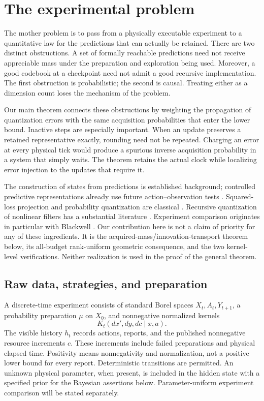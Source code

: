 \section{The experimental problem}\label{sec:experiment}
The mother problem is to pass from a physically executable experiment to a quantitative law for the predictions that can actually be retained. There are two distinct obstructions. A set of formally reachable predictions need not receive appreciable mass under the preparation and exploration being used. Moreover, a good codebook at a checkpoint need not admit a good recursive implementation. The first obstruction is probabilistic; the second is causal. Treating either as a dimension count loses the mechanism of the problem.

Our main theorem connects these obstructions by weighting the propagation of quantization errors with the same acquisition probabilities that enter the lower bound. Inactive steps are especially important. When an update preserves a retained representative exactly, rounding need not be repeated. Charging an error at every physical tick would produce a spurious inverse acquisition probability in a system that simply waits. The theorem retains the actual clock while localizing error injection to the updates that require it.

The construction of states from predictions is established background; controlled predictive representations already use future action--observation tests \cite{psr}. Squared-loss projection and probability quantization are classical \cite{graf}. Recursive quantization of nonlinear filters has a substantial literature \cite{pages,sellami,feuer}. Experiment comparison originates in particular with Blackwell \cite{blackwell}. Our contribution here is not a claim of priority for any of these ingredients. It is the acquired-mass/innovation-transport theorem below, its all-budget rank-uniform geometric consequence, and the two kernel-level verifications. Neither realization is used in the proof of the general theorem.

\subsection{Raw data, strategies, and preparation}
A discrete-time experiment consists of standard Borel spaces $X_t,A_t,Y_{t+1}$, a probability preparation $\mu$ on $X_0$, and nonnegative normalized kernels
\begin{equation}\label{eq:raw}
 K_t(dx',dy,dc\mid x,a).
\end{equation}
The visible history $h_t$ records actions, reports, and the published nonnegative resource increments $c$. These increments include failed preparations and physical elapsed time. Positivity means nonnegativity and normalization, not a positive lower bound for every report. Deterministic transitions are permitted. An unknown physical parameter, when present, is included in the hidden state with a specified prior for the Bayesian assertions below. Parameter-uniform experiment comparison will be stated separately.

